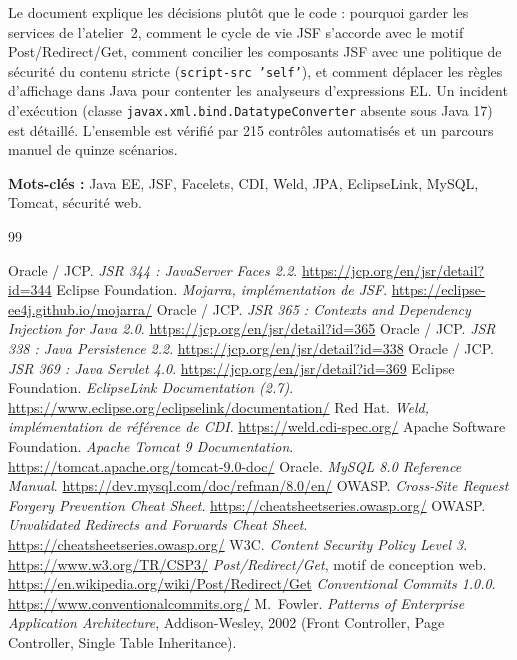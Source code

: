 \documentclass[11pt,a4paper]{report}
\newcommand{\nbChecks}{215}
\begin{document}
Le document explique les décisions plutôt que le code : pourquoi garder les services de l'atelier~2,
comment le cycle de vie JSF s'accorde avec le motif Post/Redirect/Get, comment concilier les composants JSF
avec une politique de sécurité du contenu stricte (\texttt{script-src 'self'}), et comment déplacer les
règles d'affichage dans Java pour contenter les analyseurs d'expressions EL. Un incident d'exécution
(classe \texttt{javax.xml.bind.DatatypeConverter} absente sous Java 17) est détaillé. L'ensemble est vérifié
par \nbChecks{} contrôles automatisés et un parcours manuel de quinze scénarios.

\textbf{Mots-clés :} Java EE, JSF, Facelets, CDI, Weld, JPA, EclipseLink, MySQL, Tomcat, sécurité web.

\tableofcontents
\listoffigures
\listoftables















\begin{thebibliography}{99}
 Oracle / JCP. \textit{JSR 344 : JavaServer Faces 2.2}. \url{https://jcp.org/en/jsr/detail?id=344}
 Eclipse Foundation. \textit{Mojarra, implémentation de JSF}. \url{https://eclipse-ee4j.github.io/mojarra/}
 Oracle / JCP. \textit{JSR 365 : Contexts and Dependency Injection for Java 2.0}. \url{https://jcp.org/en/jsr/detail?id=365}
 Oracle / JCP. \textit{JSR 338 : Java Persistence 2.2}. \url{https://jcp.org/en/jsr/detail?id=338}
 Oracle / JCP. \textit{JSR 369 : Java Servlet 4.0}. \url{https://jcp.org/en/jsr/detail?id=369}
 Eclipse Foundation. \textit{EclipseLink Documentation (2.7)}. \url{https://www.eclipse.org/eclipselink/documentation/}
 Red Hat. \textit{Weld, implémentation de référence de CDI}. \url{https://weld.cdi-spec.org/}
 Apache Software Foundation. \textit{Apache Tomcat 9 Documentation}. \url{https://tomcat.apache.org/tomcat-9.0-doc/}
 Oracle. \textit{MySQL 8.0 Reference Manual}. \url{https://dev.mysql.com/doc/refman/8.0/en/}
 OWASP. \textit{Cross-Site Request Forgery Prevention Cheat Sheet}. \url{https://cheatsheetseries.owasp.org/}
 OWASP. \textit{Unvalidated Redirects and Forwards Cheat Sheet}. \url{https://cheatsheetseries.owasp.org/}
 W3C. \textit{Content Security Policy Level 3}. \url{https://www.w3.org/TR/CSP3/}
 \textit{Post/Redirect/Get}, motif de conception web. \url{https://en.wikipedia.org/wiki/Post/Redirect/Get}
 \textit{Conventional Commits 1.0.0}. \url{https://www.conventionalcommits.org/}
 M.~Fowler. \textit{Patterns of Enterprise Application Architecture}, Addison-Wesley, 2002 (Front Controller, Page Controller, Single Table Inheritance).
\end{thebibliography}

\appendix

\end{document}
